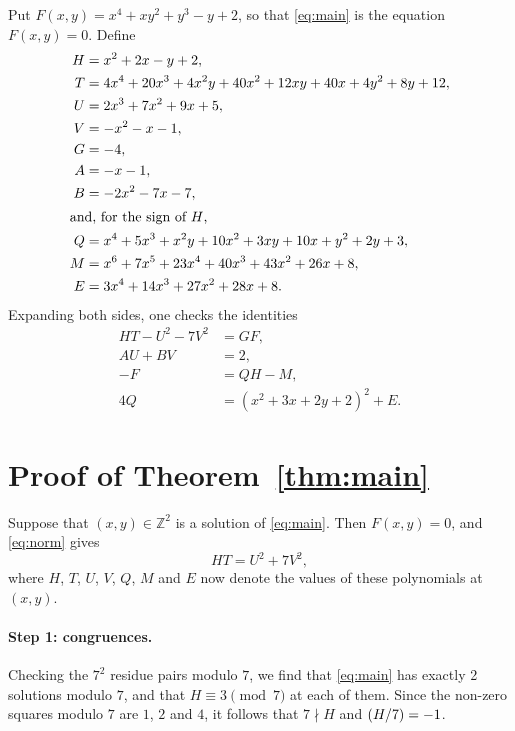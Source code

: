 \documentclass[11pt]{article}
\newcommand{\Z}{\mathbb{Z}}
\newcommand{\leg}[2]{\mathchoice{\biggl(\dfrac{#1}{#2}\biggr)}{(#1/#2)}{(#1/#2)}{(#1/#2)}}
\begin{document}
Put $F(x,y)=x^{4}+xy^{2}+y^{3}-y+2$, so that \eqref{eq:main} is the equation $F(x,y)=0$. Define
\begin{align*}
H&=x^{2}+2x-y+2,\\
T&=4x^{4}+20x^{3}+4x^{2}y+40x^{2}+12xy+40x+4y^{2}+8y+12,\\
U&=2x^{3}+7x^{2}+9x+5,\\
V&=-x^{2}-x-1,\\
G&=-4,\\
A&=-x-1,\\
B&=-2x^{2}-7x-7,\\
\intertext{and, for the sign of $H$,}
Q&=x^{4}+5x^{3}+x^{2}y+10x^{2}+3xy+10x+y^{2}+2y+3,\\
M&=x^{6}+7x^{5}+23x^{4}+40x^{3}+43x^{2}+26x+8,\\
E&=3x^{4}+14x^{3}+27x^{2}+28x+8.
\end{align*}
Expanding both sides, one checks the identities
\begin{align}
HT-U^2-7V^2&=GF,\label{eq:norm}\\
AU+BV&=2,\label{eq:bezout}\\
-F&=QH-M,\label{eq:sign}\\
4Q&=(x^{2}+3x+2y+2)^2+E.\label{eq:sign2}
\end{align}

\section{Proof of Theorem~\ref{thm:main}}

Suppose that $(x,y)\in\Z^2$ is a solution of \eqref{eq:main}. Then $F(x,y)=0$, and \eqref{eq:norm} gives
\begin{equation}\label{eq:HT}
HT=U^2+7V^2,
\end{equation}
where $H$, $T$, $U$, $V$, $Q$, $M$ and $E$ now denote the values of these polynomials at $(x,y)$.

\paragraph{Step 1: congruences.} Checking the $7^2$ residue pairs modulo $7$, we find that \eqref{eq:main} has exactly 2 solutions modulo $7$, and that $H\equiv3\pmod{7}$ at each of them. Since the non-zero squares modulo $7$ are $1$, $2$ and $4$, it follows that $7\nmid H$ and $\leg{H}{7}=-1$.
\end{document}
